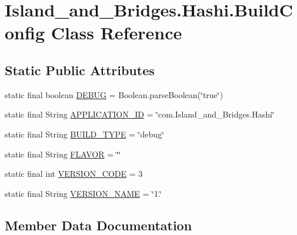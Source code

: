 \hypertarget{class_island__and___bridges_1_1_hashi_1_1_build_config}{}\section{Island\+\_\+and\+\_\+\+Bridges.\+Hashi.\+Build\+Config Class Reference}
\label{class_island__and___bridges_1_1_hashi_1_1_build_config}
\subsection*{Static Public Attributes}
\begin{DoxyCompactItemize}
\item 
static final boolean \mbox{\hyperlink{class_island__and___bridges_1_1_hashi_1_1_build_config_a32b4af113d082fc1b02b71f1737f66a6}{D\+E\+B\+UG}} = Boolean.\+parse\+Boolean(\char`\"{}true\char`\"{})
\item 
static final String \mbox{\hyperlink{class_island__and___bridges_1_1_hashi_1_1_build_config_a347f700aa050e08452732d98373e8b6d}{A\+P\+P\+L\+I\+C\+A\+T\+I\+O\+N\+\_\+\+ID}} = \char`\"{}com.\+Island\+\_\+and\+\_\+\+Bridges.\+Hashi\char`\"{}
\item 
static final String \mbox{\hyperlink{class_island__and___bridges_1_1_hashi_1_1_build_config_a139fc1578a0084112864e12e1e296e35}{B\+U\+I\+L\+D\+\_\+\+T\+Y\+PE}} = \char`\"{}debug\char`\"{}
\item 
static final String \mbox{\hyperlink{class_island__and___bridges_1_1_hashi_1_1_build_config_a8fedcdff1b0a8421b758f14adc5994b9}{F\+L\+A\+V\+OR}} = \char`\"{}\char`\"{}
\item 
static final int \mbox{\hyperlink{class_island__and___bridges_1_1_hashi_1_1_build_config_a3ca198ab3a3f0c1e29514edf4018a4a6}{V\+E\+R\+S\+I\+O\+N\+\_\+\+C\+O\+DE}} = 3
\item 
static final String \mbox{\hyperlink{class_island__and___bridges_1_1_hashi_1_1_build_config_a6db39b7da6fff24c4760af5a2109ce49}{V\+E\+R\+S\+I\+O\+N\+\_\+\+N\+A\+ME}} = \char`\"{}1.\char`\"{}
\end{DoxyCompactItemize}


\subsection{Member Data Documentation}
\mbox{\label{class_island__and___bridges_1_1_hashi_1_1_build_config_a347f700aa050e08452732d98373e8b6d}} 
